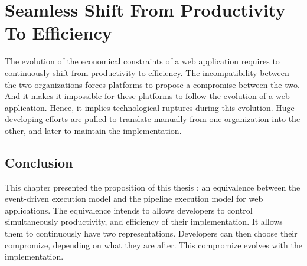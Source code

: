 \renewcommand{\glyph}{\iconfont{\XeTeXglyph46}}
\chapter{Seamless Shift From Productivity To Efficiency} \label{chapter4}
\minitoc
\eject

The evolution of the economical constraints of a web application requires to continuously shift from productivity to efficiency.
The incompatibility between the two organizations forces platforms to propose a compromise between the two.
And it makes it impossible for these platforms to follow the evolution of a web application.
Hence, it implies technological ruptures during this evolution.
Huge developing efforts are pulled to translate manually from one organization into the other, and later to maintain the implementation. %









\section{Conclusion}

This chapter presented the proposition of this thesis : an equivalence between the event-driven execution model and the pipeline execution model for web applications.
The equivalence intends to allows developers to control simultaneously productivity, and efficiency of their implementation.
It allows them to continuously have two representations.
Developers can then choose their compromize, depending on what they are after.
This compromize evolves with the implementation.

